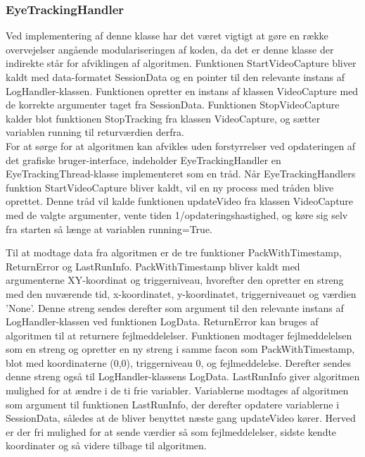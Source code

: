 \documentclass[rapport.tex]{subfiles}
\begin{document}
	
	\subsubsection{EyeTrackingHandler}
	Ved implementering af denne klasse har det været vigtigt at gøre en række overvejelser angående modulariseringen af koden, da det er denne klasse der indirekte står for afviklingen af algoritmen. Funktionen StartVideoCapture bliver kaldt med data-formatet SessionData og en pointer til den relevante instans af LogHandler-klassen. Funktionen opretter en instans af klassen VideoCapture med de korrekte argumenter taget fra SessionData.
	Funktionen StopVideoCapture kalder blot funktionen StopTracking fra klassen VideoCapture, og sætter variablen running til returværdien derfra.\\
	 
	For at sørge for at algoritmen kan afvikles uden forstyrrelser ved opdateringen af det grafiske bruger-interface, indeholder EyeTrackingHandler en EyeTrackingThread-klasse implementeret som en tråd. Når EyeTrackingHandlers funktion StartVideoCapture bliver kaldt, vil en ny process med tråden blive oprettet. Denne tråd vil kalde funktionen updateVideo fra klassen VideoCapture med de valgte argumenter, vente tiden 1/opdateringshastighed, og køre sig selv fra starten så længe at variablen running=True.
	
	Til at modtage data fra algoritmen er de tre funktioner PackWithTimestamp, ReturnError og LastRunInfo. PackWithTimestamp bliver kaldt med argumenterne XY-koordinat og triggerniveau, hvorefter den opretter en streng med den nuværende tid, x-koordinatet, y-koordinatet, triggerniveauet og værdien 'None'. Denne streng sendes derefter som argument til den relevante instans af LogHandler-klassen ved funktionen LogData. ReturnError kan bruges af algoritmen til at returnere fejlmeddelelser. Funktionen modtager fejlmeddelelsen som en streng og opretter en ny streng i samme facon som PackWithTimestamp, blot med koordinaterne (0,0), triggerniveau 0, og fejlmeddelelse. Derefter sendes denne streng også til LogHandler-klassens LogData. LastRunInfo giver algoritmen mulighed for at ændre i de ti frie variabler. Variablerne modtages af algoritmen som argument til funktionen LastRunInfo, der derefter opdatere variablerne i SessionData, således at de bliver benyttet næste gang updateVideo kører. Herved er der fri mulighed for at sende værdier så som fejlmeddelelser, sidste kendte koordinater og så videre tilbage til algoritmen. 
	
\end{document}
